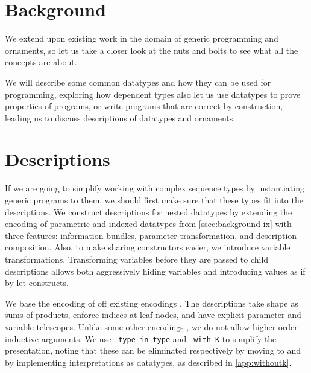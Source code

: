 \documentclass[10pt]{article}
\theoremstyle{plain}
\theoremstyle{definition}
\newcommand{\AD}[1]{\AgdaDatatype{#1}}
\begin{document}
\part*{Background}\label{part:background}
% 
We extend upon existing work in the domain of generic programming and ornaments, so let us take a closer look at the nuts and bolts to see what all the concepts are about.

We will describe some common datatypes and how they can be used for programming, exploring how dependent types also let us use datatypes to prove properties of programs, or write programs that are correct-by-construction, leading us to discuss descriptions of datatypes and ornaments.
    



\part{Descriptions}\label{part:ornament}
If we are going to simplify working with complex sequence types by instantiating generic programs to them, we should first make sure that these types fit into the descriptions. We construct descriptions for nested datatypes by extending the encoding of parametric and indexed datatypes from \autoref{ssec:background-ix} with three features: information bundles, parameter transformation, and description composition. Also, to make sharing constructors easier, we introduce variable transformations. Transforming variables before they are passed to child descriptions allows both aggressively hiding variables and introducing values as if by let-constructs.

We base the encoding of off existing encodings \cite{sijsling,practgen}. The descriptions take shape as sums of products, enforce indices at leaf nodes, and have explicit parameter and variable telescopes. Unlike some other encodings \cite{effectfully, practgen}, we do not allow higher-order inductive arguments. We use \texttt{--type-in-type} and \texttt{--with-K} to simplify the presentation, noting that these can be eliminated respectively by moving to \AD{Typeω} and by implementing interpretations as datatypes, as described in \autoref{app:withoutk}.
\end{document}
